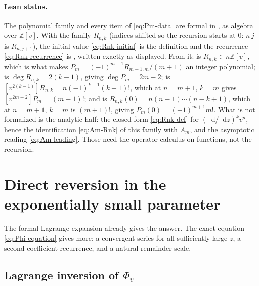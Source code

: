 \documentclass[11pt,oneside]{article}
\theoremstyle{plain}
\theoremstyle{definition}
\theoremstyle{remark}
\newcommand{\dd}{\mathop{}\!\mathrm{d}}
\begin{document}
\paragraph{Lean status.}
The polynomial family and every item of \eqref{eq:Pm-data} are formal in
, as algebra over \(\mathbb{Z}[v]\).  With
 the family \(R_{n,k}\) (indices shifted so the recursion starts
at \(0\):  \(n\,j\) is \(R_{n,j+1}\)), the initial value
\eqref{eq:Rnk-initial} is the definition and the recurrence \eqref{eq:Rnk-recurrence} is
, written exactly as displayed.  From it:
 is \(R_{n,k}\in n\mathbb{Z}[v]\), which is what makes
\(P_m=(-1)^{m+1}R_{m+1,m}/(m+1)\) an integer polynomial;
 is \(\deg R_{n,k}=2(k-1)\), giving \(\deg P_m=2m-2\);
 is
\([v^{2(k-1)}]R_{n,k}=n(-1)^{k-1}(k-1)!\), which at \(n=m+1\), \(k=m\) gives
\([v^{2m-2}]P_m=(m-1)!\); and  is
\(R_{n,k}(0)=n(n-1)\cdots(n-k+1)\), which at \(n=m+1\), \(k=m\) is \((m+1)!\), giving
\(P_m(0)=(-1)^{m+1}m!\).  What is not formalized is the analytic half: the closed form
\eqref{eq:Rnk-def} for \((\dd/\dd z)^k v^n\), hence the identification \eqref{eq:Am-Rnk} of this
family with \(A_m\), and the asymptotic reading \eqref{eq:Am-leading}.  Those need the operator
calculus on functions, not the recursion.

\section{Direct reversion in the exponentially small parameter}
\label{sec:q-reversion}

The formal Lagrange expansion already gives the answer.  The exact equation
\eqref{eq:Phi-equation} gives more: a convergent series for all sufficiently
large \(z\), a second coefficient recurrence, and a natural remainder scale.

\subsection{Lagrange inversion of \texorpdfstring{\(\Phi_v\)}{Phi-v}}
\end{document}
